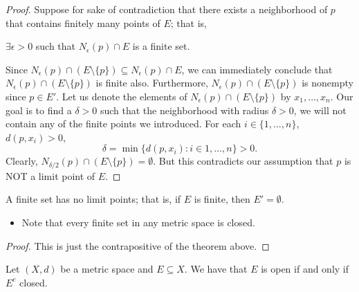\documentclass[a4paper]{report}
\begin{document}
\begin{proof}
Suppose for sake of contradiction that there exists a neighborhood of \( p  \) that contains finitely many points of \( E  \); that is,
\begin{center}
    \( \exists \epsilon > 0  \) such that \( {N}_{\epsilon}(p) \cap E  \) is a finite set.
\end{center}
Since \( {N}_{\epsilon}(p) \cap (E \setminus  \{ p \} ) \subseteq  {N}_{\epsilon}(p) \cap E  \), we can immediately conclude that \( {N}_{\epsilon}(p) \cap (E \setminus  \{ p \} ) \) is finite also. Furthermore, \( {N}_{\epsilon}(p) \cap (E \setminus  \{ p  \} ) \) is nonempty since \( p \in E' \). Let us denote the elements of \( {N}_{\epsilon}(p) \cap (E \setminus  \{ p \} )  \) by \( {x}_{1}, \dots, {x}_{n} \). Our goal is to find a \( \delta > 0  \) such that the neighborhood with radius \( \delta > 0  \), we will not contain any of the finite points we introduced. For each \( i \in \{ 1,\dots, n \}  \), \( d(p,{x}_{i}) > 0  \),
\[  \delta = \min \{ d(p,{x}_{i}) : i \in {1,\dots,n} \} > 0.   \]
Clearly, \( {N}_{\delta/2}(p) \cap (E \setminus  \{ p \} ) = \emptyset \). But this contradicts our assumption that \( p  \) is NOT a limit point of \( E  \).
\end{proof}

\begin{corollary}
    A finite set has no limit points; that is, if \( E  \) is finite, then \( E' = \emptyset \).
\end{corollary}
\begin{itemize}
    \item Note that every finite set in any metric space is closed.
\end{itemize}

\begin{proof}
This is just the contrapositive of the theorem above.
\end{proof}

\begin{theorem}[ ]
  Let \( (X,d) \) be a metric space and \( E \subseteq X  \). We have that \( E  \) is open if and only if \( E^{c} \) closed.
\end{theorem}
\end{document}
